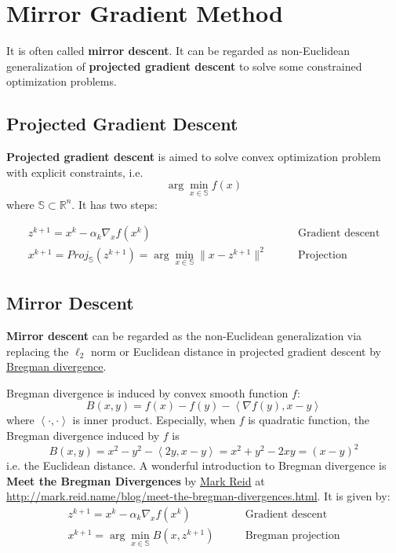 \documentclass[titlestyle=hang,11pt]{elegantbook}
\begin{document}

\section{Mirror Gradient Method}

It is often called \textbf{mirror descent}.
It can be regarded as non-Euclidean generalization of \textbf{projected gradient descent} to solve some constrained optimization problems.

\subsection{Projected Gradient Descent}

\textbf{Projected gradient descent} is aimed to solve convex optimization problem with explicit constraints, i.e.
$$
\arg\min_{x\in\mathbb{S}}f(x)
$$
where $\mathbb{S}\subset\mathbb{R}^n$.
It has two steps:

\begin{align}
z^{k+1} = x^{k}-\alpha_k\nabla_x f(x^{k}) &\qquad \text{Gradient descent}\\
x^{k+1} = Proj_{\mathbb{S}}(z^{k+1})=\arg\min_{x\in \mathbb{S}}\|x-z^{k+1}\|^{2} &\qquad\text{Projection}
\end{align}


\subsection{Mirror Descent}

\textbf{Mirror descent} can be regarded as the non-Euclidean generalization via replacing the $\ell_2$ norm or Euclidean distance in projected gradient descent by \href{https://www.mdpi.com/1099-4300/16/12/6338/htm}{Bregman divergence}.

Bregman divergence is induced by convex smooth function $f$:
$$
B(x,y)=f(x)-f(y)-\left<\nabla f(y),x-y\right>
$$
where $\left<\cdot,\cdot\right>$ is inner product.
Especially, when $f$ is quadratic function, the Bregman divergence induced by $f$ is
$$
B(x,y)=x^2-y^2-\left<2y,x-y\right>=x^2+y^2-2xy=(x-y)^2
$$
i.e. the Euclidean distance.
A wonderful introduction to Bregman divergence is \textbf{Meet the Bregman Divergences} by \href{http://mark.reid.name}{Mark Reid} at \url{http://mark.reid.name/blog/meet-the-bregman-divergences.html}.
It is given by:
\begin{align}
z^{k+1} = x^{k}-\alpha_k\nabla_x f(x^{k}) &\qquad \text{Gradient descent}\\
x^{k+1} = \arg\min_{x\in\mathbb{S}}B(x,z^{k+1}) &\qquad\text{Bregman projection}
\end{align}
\end{document}
